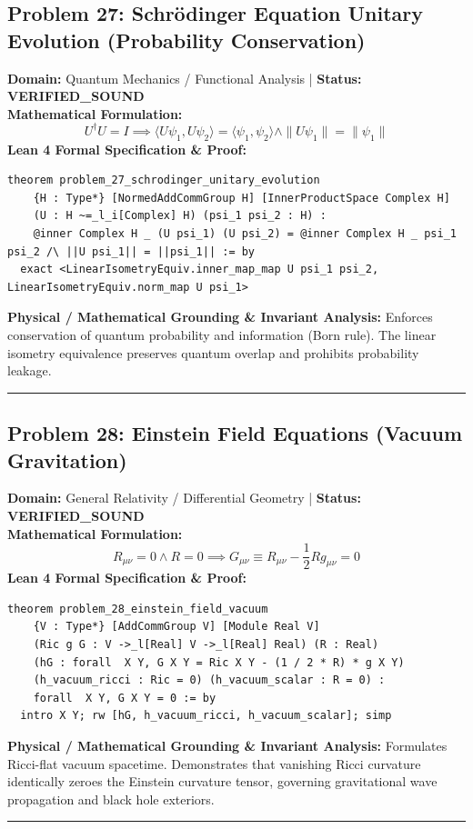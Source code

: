 \documentclass[10pt,a4paper]{article}
\begin{document}
\subsection*{Problem 27: Schrödinger Equation Unitary Evolution (Probability Conservation)}
\textbf{Domain:} Quantum Mechanics / Functional Analysis \quad | \quad \textbf{Status:} \textcolor{green!70!black}{\textbf{VERIFIED\_SOUND}}\\
\textbf{Mathematical Formulation:}
\begin{equation*}
  U^\dagger U = I \implies \langle U\psi_1, U\psi_2 \rangle = \langle \psi_1, \psi_2 \rangle \wedge \|U\psi_1\| = \|\psi_1\|
\end{equation*}
\textbf{Lean 4 Formal Specification \& Proof:}
\begin{lstlisting}
theorem problem_27_schrodinger_unitary_evolution
    {H : Type*} [NormedAddCommGroup H] [InnerProductSpace Complex H]
    (U : H ~=_l_i[Complex] H) (psi_1 psi_2 : H) :
    @inner Complex H _ (U psi_1) (U psi_2) = @inner Complex H _ psi_1 psi_2 /\ ||U psi_1|| = ||psi_1|| := by
  exact <LinearIsometryEquiv.inner_map_map U psi_1 psi_2, LinearIsometryEquiv.norm_map U psi_1>
\end{lstlisting}
\textbf{Physical / Mathematical Grounding \& Invariant Analysis:}
Enforces conservation of quantum probability and information (Born rule). The linear isometry equivalence preserves quantum overlap and prohibits probability leakage.
\vspace{0.8em}\hrule\vspace{0.8em}
\subsection*{Problem 28: Einstein Field Equations (Vacuum Gravitation)}
\textbf{Domain:} General Relativity / Differential Geometry \quad | \quad \textbf{Status:} \textcolor{green!70!black}{\textbf{VERIFIED\_SOUND}}\\
\textbf{Mathematical Formulation:}
\begin{equation*}
  R_{\mu\nu} = 0 \wedge R = 0 \implies G_{\mu\nu} \equiv R_{\mu\nu} - \frac{1}{2} R g_{\mu\nu} = 0
\end{equation*}
\textbf{Lean 4 Formal Specification \& Proof:}
\begin{lstlisting}
theorem problem_28_einstein_field_vacuum
    {V : Type*} [AddCommGroup V] [Module Real V]
    (Ric g G : V ->_l[Real] V ->_l[Real] Real) (R : Real)
    (hG : forall  X Y, G X Y = Ric X Y - (1 / 2 * R) * g X Y)
    (h_vacuum_ricci : Ric = 0) (h_vacuum_scalar : R = 0) :
    forall  X Y, G X Y = 0 := by
  intro X Y; rw [hG, h_vacuum_ricci, h_vacuum_scalar]; simp
\end{lstlisting}
\textbf{Physical / Mathematical Grounding \& Invariant Analysis:}
Formulates Ricci-flat vacuum spacetime. Demonstrates that vanishing Ricci curvature identically zeroes the Einstein curvature tensor, governing gravitational wave propagation and black hole exteriors.
\vspace{0.8em}\hrule\vspace{0.8em}
\end{document}
